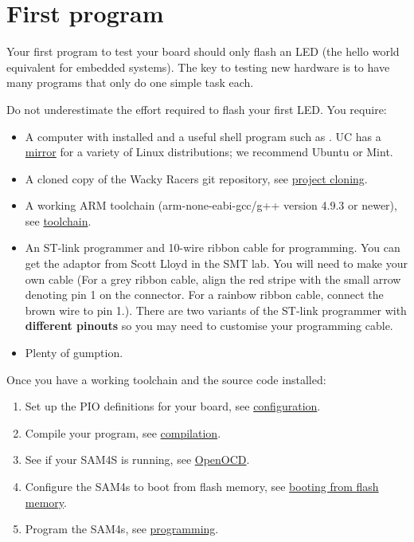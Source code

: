 \chapter{First program}
\label{first-program}

Your first program to test your board should only flash an LED (the
hello world equivalent for embedded systems). The key to testing new
hardware is to have many programs that only do one simple task each.

Do not underestimate the effort required to flash your first LED. You
require:
%
\begin{itemize}
\item
  A computer with  installed and a useful shell program
  such as . UC has a
  \href{http://ucmirror.canterbury.ac.nz/}{mirror} for a variety of
  Linux distributions; we recommend Ubuntu or Mint.

\item A cloned copy of the Wacky Racers git repository, see
  \hyperref[project-cloning]{project cloning}.

\item
  A working ARM toolchain (arm-none-eabi-gcc/g++ version 4.9.3 or
  newer), see \hyperref[toolchain]{toolchain}.

\item
  An ST-link programmer and 10-wire ribbon cable for programming. You
  can get the adaptor from Scott Lloyd in the SMT lab. You will need
  to make your own cable (For a grey ribbon cable, align the red
  stripe with the small arrow denoting pin 1 on the connector. For a
  rainbow ribbon cable, connect the brown wire to pin 1.). There are
  two variants of the ST-link programmer with \textbf{different
  pinouts} so you may need to customise your programming cable.
\item
  Plenty of gumption.
\end{itemize}


Once you have a working toolchain and the source code installed:
%
\begin{enumerate}
\item Set up the PIO definitions for your board, see
  \hyperref[configuration]{configuration}.

\item Compile your program, see \hyperref[compilation]{compilation}.

\item See if your SAM4S is running, see \hyperref[openocd]{OpenOCD}.

\item Configure the SAM4s to boot from flash memory, see
  \hyperref[booting-from-flash-memory]{booting from flash memory}.

\item Program the SAM4s, see \hyperref[programming]{programming}.
\end{enumerate}


